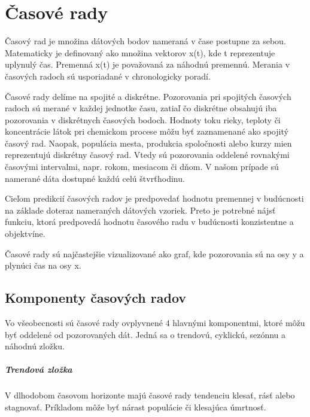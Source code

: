 \documentclass[12pt,oneside,slovak,a4paper]{book}
\begin{document}

\chapter{Časové rady}
Časový rad je množina dátových bodov nameraná v čase postupne za sebou.
Matematicky je definovaný ako množina vektorov x(t), kde t reprezentuje
uplynulý čas. Premenná x(t) je považovaná za náhodnú premennú.
Merania v časových radoch sú usporiadané v chronologicky
poradí\cite{Agrawal2013}.

Časové rady delíme na spojité a diskrétne. Pozorovania pri spojitých časových
radoch sú merané v každej jednotke času, zatiaľ čo diskrétne obsahujú iba
pozorovania v diskrétnych časových bodoch. Hodnoty toku rieky, teploty
či koncentrácie látok pri chemickom procese môžu byť zaznamenané ako spojitý
časový rad. Naopak, populácia mesta, produkcia spoločnosti alebo kurzy mien
reprezentujú diskrétny časový rad. Vtedy sú pozorovania oddelené rovnakými
časovými intervalmi, napr. rokom, mesiacom či dňom. V našom prípade sú namerané
dáta dostupné každú celú štvrťhodinu\cite{Agrawal2013}.

Cieľom predikcií časových radov je predpovedať hodnotu premennej v budúcnosti
na základe doteraz nameraných dátových vzoriek. Preto je potrebné nájsť funkciu,
ktorá predpovedá hodnotu časového radu v budúcnosti konzistentne
a objektvíne\cite{Sapankevych2009}.

Časové rady sú najčastejšie vizualizované ako graf, kde pozorovania sú na
osy y a plynúci čas na osy x.

\section{Komponenty časových radov}
Vo všeobecnosti sú časové rady ovplyvnené 4 hlavnými komponentmi, ktoré môžu
byť oddelené od pozorovaných dát. Jedná sa o trendovú, cyklickú, sezónnu
a náhodnú zložku\cite{Agrawal2013}.

\paragraph{Trendová zložka}
V dlhodobom časovom horizonte majú časové rady tendenciu klesať, rásť alebo
stagnovať. Príkladom môže byť nárast populácie či klesajúca
úmrtnosť\cite{Agrawal2013}.
\end{document}
